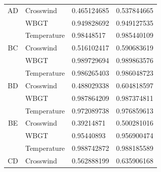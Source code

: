 \documentclass[a4paper,12pt]{article}
\begin{document}
\begin{table}[]
\begin{tabular}{llll}
 		\multicolumn{1}{c}{AD}                      & Crosswind                        & 0.465124685                              & 0.537844665                               \\
 		& WBGT                             & 0.949828692                              & 0.949127535                               \\ \hline
 		\multicolumn{1}{|l|}{}                      & \multicolumn{1}{l|}{Temperature} & \multicolumn{1}{l|}{0.98448517}          & \multicolumn{1}{l|}{0.985440109}          \\ \hline
 		\multicolumn{1}{|c|}{BC}                    & \multicolumn{1}{l|}{Crosswind}   & \multicolumn{1}{l|}{0.516102417}         & \multicolumn{1}{l|}{0.590683619}          \\ \hline
 		\multicolumn{1}{|l|}{}                      & \multicolumn{1}{l|}{WBGT}        & \multicolumn{1}{l|}{0.989729694}         & \multicolumn{1}{l|}{0.989863576}          \\ \hline
 		& Temperature                      & 0.986265403                              & 0.986048723                               \\
 		\multicolumn{1}{c}{BD}                      & Crosswind                        & 0.488029338                              & 0.604818597                               \\
 		& WBGT                             & 0.987864209                              & 0.987374811                               \\ \hline
 		\multicolumn{1}{|l|}{}                      & \multicolumn{1}{l|}{Temperature} & \multicolumn{1}{l|}{0.972089738}         & \multicolumn{1}{l|}{0.976859613}          \\ \hline
 		\multicolumn{1}{|c|}{BE}                    & \multicolumn{1}{l|}{Crosswind}   & \multicolumn{1}{l|}{0.39214871}          & \multicolumn{1}{l|}{0.500281016}          \\ \hline
 		\multicolumn{1}{|l|}{}                      & \multicolumn{1}{l|}{WBGT}        & \multicolumn{1}{l|}{0.95440893}          & \multicolumn{1}{l|}{0.956900474}          \\ \hline
 		& Temperature                      & 0.988742872                              & 0.988185589                               \\
 		\multicolumn{1}{c}{CD}                      & Crosswind                        & 0.562888199                              & 0.635906168                               \\

\end{tabular}
\end{table}
\end{document}
